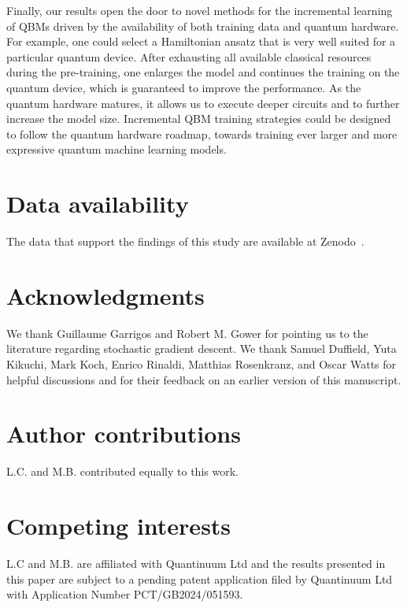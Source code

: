 \documentclass[
    reprint,
    aps,
    prx,
    longbibliography
]{revtex4-2}
\begin{document}
Finally, our results open the door to novel methods for the incremental learning of QBMs driven by the availability of both training data and quantum hardware. For example, one could select a Hamiltonian ansatz that is very well suited for a particular quantum device. After exhausting all available classical resources during the pre-training, one enlarges the model and continues the training on the quantum device, which is guaranteed to improve the performance. As the quantum hardware matures, it allows us to execute deeper circuits and to further increase the model size. Incremental QBM training strategies could be designed to follow the quantum hardware roadmap, towards training ever larger and more expressive quantum machine learning models.

\newpage

\section*{Data availability}
The data that support the findings of this study are available at Zenodo~\cite{zenodo_files}.

\section*{Acknowledgments}
We thank Guillaume Garrigos and Robert M. Gower for pointing us to the literature regarding stochastic gradient descent. We thank Samuel Duffield, Yuta Kikuchi, Mark Koch, Enrico Rinaldi, Matthias Rosenkranz, and Oscar Watts for helpful discussions and for their feedback on an earlier version of this manuscript.

\section*{Author contributions}
L.C. and M.B. contributed equally to this work.

\section*{Competing interests}
L.C and M.B. are affiliated with Quantinuum Ltd and the results presented in this paper are subject to a pending patent application filed by Quantinuum Ltd with Application Number PCT/GB2024/051593.

\let\oldaddcontentsline\addcontentsline
\renewcommand{\addcontentsline}[3]{}

\let\addcontentsline\oldaddcontentsline
\end{document}
